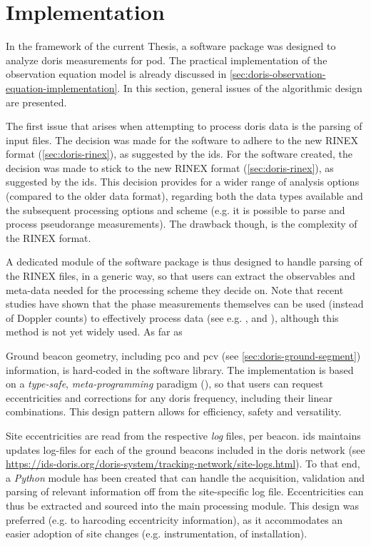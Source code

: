 \section{Implementation}\label{sec:doris-implementation}
In the framework of the current Thesis, a software package was designed to analyze 
\gls{doris} measurements for \gls{pod}. The practical implementation of the observation 
equation model is already discussed in \autoref{sec:doris-observation-equation-implementation}. 
In this section, general issues of the algorithmic design are presented.

The first issue that arises when attempting to process \gls{doris} data is the 
parsing of input files. The decision was made for the software to adhere to 
the new RINEX format (\autoref{sec:doris-rinex}), as suggested by the \gls{ids}.
For the software created, the decision was made to stick to the new 
RINEX format (\autoref{sec:doris-rinex}), as suggested by the \gls{ids}. This decision 
provides for a wider range of analysis options (compared to the older data format), 
regarding both the data types available and the subsequent processing options and 
scheme (e.g. it is possible to parse and process pseudorange measurements). The 
drawback though, is the complexity of the RINEX format.

A dedicated module of the software package is thus designed to handle parsing of the 
RINEX files, in a generic way, so that users can extract the observables and meta-data 
needed for the processing scheme they decide on. Note that recent studies have shown that 
the phase measurements themselves can be used (instead of Doppler counts) to effectively 
process data (see e.g. \cite{Mercier2010}, \cite{Dettmering2014} and \cite{Zhou2020}), 
although this method is not yet widely used. As far as 

Ground beacon geometry, including \gls{pco} and \gls{pcv} (see \autoref{sec:doris-ground-segment}) 
information, is hard-coded in the software library. The implementation is based on a 
\emph{type-safe}, \emph{meta-programming} paradigm (\cite{Vandevoorde2017}), so that 
users can request eccentricities and corrections for any \gls{doris} frequency, including 
their linear combinations. This design pattern allows for efficiency, safety and 
versatility.

Site eccentricities are read from the respective \emph{log} files, per beacon. 
\gls{ids} maintains updates log-files for each of the ground beacons included in 
the \gls{doris} network (see \url{https://ids-doris.org/doris-system/tracking-network/site-logs.html}). 
To that end, a \emph{Python} module has been created that can handle the acquisition, 
validation and parsing of relevant information off from the site-specific log file. 
Eccentricities can thus be extracted and sourced into the main processing module. 
This design was preferred (e.g. to harcoding eccentricity information), as it accommodates 
an easier adoption of site changes (e.g. instrumentation, of installation).

